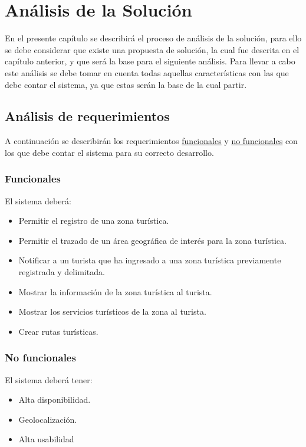 \chapter{Análisis de la Solución}

En el presente capítulo se describirá el proceso de análisis de la solución, para ello se debe considerar que existe una propuesta de solución, la cual fue descrita en el capítulo anterior, y que será la base para el siguiente análisis. Para llevar a cabo este análisis se debe tomar en cuenta todas aquellas características con las que debe contar el sistema, ya que estas serán la base de la cual partir. 

\section{Análisis de requerimientos}
A continuación se describirán los requerimientos \hyperlink{cv:funcionales}{funcionales} y \hyperlink{cv:noFuncionales}{no funcionales} con los que debe contar el sistema para su correcto desarrollo.

\hypertarget{cv:funcionales}{\subsection{Funcionales}}

El sistema deberá:

\begin{itemize}
	\item Permitir el registro de una zona turística.
	\item Permitir el trazado de un área geográfica de interés para la zona turística.
	\item Notificar a un turista que ha ingresado a una zona turística previamente registrada y delimitada.
	\item Mostrar la información de la zona turística al turista.
	\item Mostrar los servicios turísticos de la zona al turista.
	\item Crear rutas turísticas.
\end{itemize}

\hypertarget{cv:noFuncionales}{\subsection{No funcionales}}

El sistema deberá tener: 

\begin{itemize}
	\item Alta disponibilidad.
	\item Geolocalización.
	\item Alta usabilidad
\end{itemize}